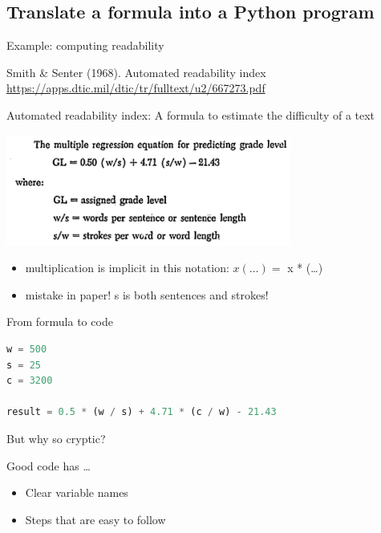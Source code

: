 \documentclass[aspectratio=169,usenames,dvipsnames]{beamer}
\begin{document}
\subsection{Translate a formula into a Python program}
\frame{\tableofcontents[currentsubsection]}
\begin{frame}{Example: computing readability}
	\begin{reference}
    Smith \& Senter (1968). Automated readability index
    \url{https://apps.dtic.mil/dtic/tr/fulltext/u2/667273.pdf}
	\end{reference}
    Automated readability index:
    A formula to estimate the difficulty of a text

    \includegraphics[width=0.7\textwidth]{fig/ari}

    \pause
    \vspace{1em}
    \begin{itemize}
        \item multiplication is implicit in this notation: $ x(\dots) = $ x * (\dots)
        \item mistake in paper! s is both sentences and strokes!
    \end{itemize}
\end{frame}

\begin{frame}[fragile]{From formula to code}
\begin{lstlisting}[language=python]
w = 500
s = 25
c = 3200

result = 0.5 * (w / s) + 4.71 * (c / w) - 21.43
\end{lstlisting}

\pause But why so cryptic?

    Good code has \dots

\begin{itemize}
    \item Clear variable names
    \item Steps that are easy to follow
\end{itemize}
\end{frame}
\end{document}
